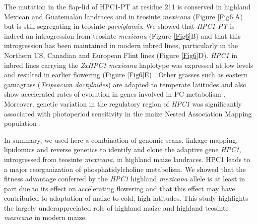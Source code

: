 \documentclass[9pt,twocolumn,twoside,lineno]{BioRxiv}
\begin{document}
The mutation in the flap-lid of HPC1-PT at residue 211 is conserved in highland Mexican and Guatemalan landraces and in teosinte \textit{mexicana} (Figure \ref{Fig6}A) but is still segregating in teosinte \textit{parviglumis}. 
We showed that \textit{HPC1-PT} is  indeed an introgression from teosinte \textit{mexicana} (Figure \ref{Fig6}B) and that this introgression has been maintained in modern inbred lines, particularly in the Northern US, Canadian and European Flint lines (Figure \ref{Fig6}D). 
\textit{HPC1} in inbred lines carrying the \textit{ZxHPC1} \textit{mexicana} haplotype was expressed at low levels and resulted in earlier flowering (Figure \ref{Fig6}E) \cite{Kremling2018-gn}. 
Other grasses such as eastern gamagrass (\textit{Tripsacum dactyloides}) are adapted to temperate latitudes and also show accelerated rates of evolution in genes involved in PC metabolism \cite{Yan2019-tx}.
Moreover, genetic variation in the regulatory region of \textit{HPC1} was significantly associated with photoperiod sensitivity in the maize Nested Association Mapping population \cite{Hung2012-ms}. 

In summary, we used here a combination of genomic scans, linkage mapping, lipidomics and reverse genetics to identify and clone the adaptive gene \textit{HPC1}, introgressed from teosinte  \textit{mexicana}, in highland maize landraces. HPC1 leads to a major reorganization of phosphatidylcholine metabolism. 
We showed that the fitness advantage conferred by the \textit{HPC1} highland \textit{mexicana} allele is at least in part due to its effect on accelerating flowering and that this effect may have contributed to adaptation of maize to cold, high latitudes. 
This study highlights the largely underappreciated role of highland maize and highland teosinte \textit{mexicana} in modern maize.

\end{document}
